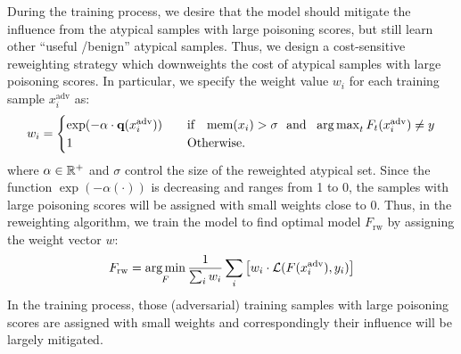 During the training process, we desire that  the model should mitigate the influence from the atypical samples with large poisoning scores, but still learn other ``useful /benign'' atypical samples. Thus, we design a cost-sensitive reweighting strategy which downweights the cost of atypical samples with large poisoning scores. In particular, we specify the weight value $w_i$ for each training sample $x_i^\text{adv}$ as:
\begin{align}\label{eq:reweight}
w_i = 
\begin{cases}
\exp (-\alpha \cdot \textbf{q}(x_i^\text{adv}))  & \text{~~~if~~~} \text{mem}(x_i)>\sigma \text{~~and~~} \operatorname*{arg\,max}_t F_t(x_i^\text{adv})\neq y\\
1 &\text{~~ Otherwise.}
\end{cases}
\end{align}
where $\alpha\in\mathbb{R}^+$ and $\sigma$ control the size of the reweighted atypical set. Since the function $\exp(-\alpha(\cdot))$ is decreasing and ranges from 1 to 0, the samples with large poisoning scores will be assigned with small weights close to 0.
Thus, in the reweighting algorithm, we train the model to find optimal model $F_\text{rw}$ by assigning the weight vector $w$:
\begin{align}
    F_\text{rw} = \operatorname*{arg\,min}_F  \frac{1}{\sum_i w_i }\sum_i \left[w_i \cdot \mathcal{L}(F(x_i^\text{adv}), y_i)\right]
\end{align}
In the training process, those (adversarial) training samples with large poisoning scores are assigned with small weights and correspondingly their influence will be largely mitigated.


